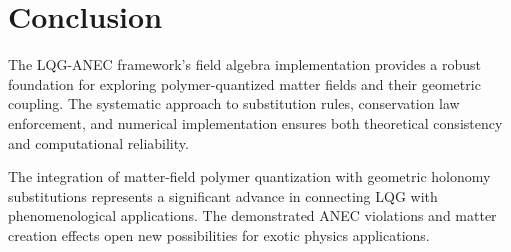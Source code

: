 \documentclass[11pt]{article}
\begin{document}
\section{Conclusion}

The LQG-ANEC framework's field algebra implementation provides a robust foundation for exploring polymer-quantized matter fields and their geometric coupling. The systematic approach to substitution rules, conservation law enforcement, and numerical implementation ensures both theoretical consistency and computational reliability.

The integration of matter-field polymer quantization with geometric holonomy substitutions represents a significant advance in connecting LQG with phenomenological applications. The demonstrated ANEC violations and matter creation effects open new possibilities for exotic physics applications.
\end{document}
